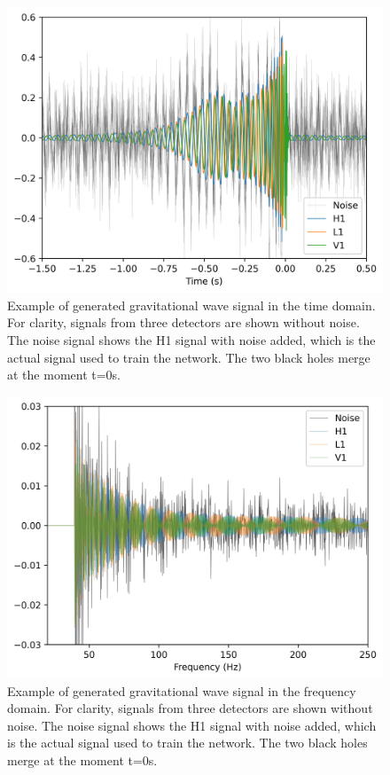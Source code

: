 \begin{figure}
  \centering
  \includegraphics[width=1\linewidth]{media/images/obs_time_domain_lowSNR.png}
  \caption{Example of generated gravitational wave signal in the time domain. For clarity, signals from three detectors are shown without noise. The noise signal shows the H1 signal with noise added, which is the actual signal used to train the network. The two black holes merge at the moment t=0s. }
  \label{fig:obs_time_domain}
\end{figure}

\begin{figure}
  \centering
  \includegraphics[width=1\linewidth]{media/images/obs_freq_domain_lowSNR.png}
  \caption{Example of generated gravitational wave signal in the frequency domain. For clarity, signals from three detectors are shown without noise. The noise signal shows the H1 signal with noise added, which is the actual signal used to train the network. The two black holes merge at the moment t=0s. }
  \label{fig:obs_freq_domain}
\end{figure}

